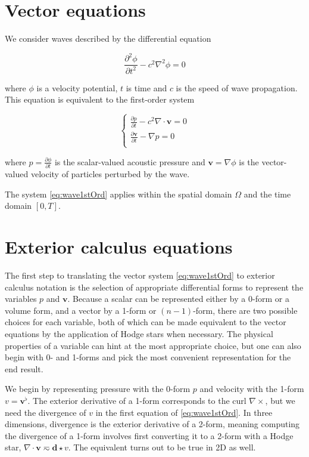 \documentclass[utf8,english]{gradu3}
\begin{document}
\section{Vector equations}

We consider waves described by the differential equation

\begin{equation}\label{eq:wave2ndOrd}
  \frac{\partial^2 \phi}{\partial t^2} - c^2 \nabla^2\phi = 0
\end{equation}

where $\phi$ is a velocity potential, $t$ is time
and $c$ is the speed of wave propagation.
This equation is equivalent to the first-order system

\begin{equation}\label{eq:wave1stOrd}
  \begin{cases}
    \frac{\partial p}{\partial t} - c^2\nabla \cdot \mathbf{v} = 0 \\
    \frac{\partial \mathbf{v}}{\partial t} - \nabla p = 0 \\
  \end{cases}
\end{equation}

where $p = \frac{\partial \phi}{\partial t}$ is the scalar-valued acoustic pressure
and $\mathbf{v} = \nabla \phi$ is the vector-valued velocity
of particles perturbed by the wave.

The system \eqref{eq:wave1stOrd} applies within the spatial domain $\Omega$
and the time domain $[0, T]$.


\section{Exterior calculus equations}

The first step to translating the vector system \eqref{eq:wave1stOrd}
to exterior calculus notation is the selection of appropriate differential forms
to represent the variables $p$ and $\mathbf{v}$.
Because a scalar can be represented either by a 0-form or a volume form,
and a vector by a 1-form or $(n-1)$-form,
there are two possible choices for each variable,
both of which can be made equivalent to the vector equations
by the application of Hodge stars when necessary.
The physical properties of a variable can hint at the most appropriate choice,
but one can also begin with 0- and 1-forms
and pick the most convenient representation for the end result.

We begin by representing pressure with the 0-form $p$
and velocity with the 1-form $v = \mathbf{v}^{\flat}$.
The exterior derivative of a 1-form corresponds to the curl $\nabla \times$,
but we need the divergence of $v$ in the first equation of \eqref{eq:wave1stOrd}.
In three dimensions, divergence is the exterior derivative of a 2-form,
meaning computing the divergence of a 1-form involves first converting
it to a 2-form with a Hodge star, $\nabla \cdot \mathbf{v} \eqsim \mathbf{d}\star v$.
The equivalent turns out to be true in 2D as well.
\end{document}
